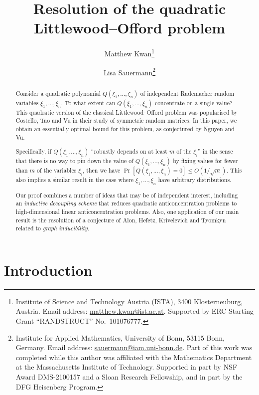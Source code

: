 \documentclass[english]{article}
\theoremstyle{remark}
\numberwithin{equation}{section}
\numberwithin{figure}{section}
\begin{document}
\title{Resolution of the quadratic Littlewood--Offord problem}
\author{Matthew Kwan\thanks{Institute of Science and Technology Austria (ISTA), 3400 Klosterneuburg, Austria. Email address: \url{matthew.kwan@ist.ac.at}. Supported by ERC Starting Grant ``RANDSTRUCT'' No.\ 101076777.}\and Lisa Sauermann\thanks{Institute for Applied Mathematics, University of Bonn, 53115 Bonn, Germany. Email address: \url{sauermann@iam.uni-bonn.de}. Part of this work was completed while this author was affiliated with the Mathematics Department at the Massachusetts Institute of Technology. Supported in part by NSF Award DMS-2100157 and a Sloan Research Fellowship, and in part by the DFG Heisenberg Program.}}

\maketitle

\begin{abstract}\noindent
Consider a quadratic polynomial $Q(\xi_{1},\dots,\xi_{n})$ of independent
Rademacher random variables $\xi_{1},\dots,\xi_{n}$. To what extent
can $Q(\xi_{1},\dots,\xi_{n})$ concentrate on a single value? This quadratic version of the classical Littlewood--Offord problem was popularised by Costello, Tao and Vu in their study of symmetric random matrices.
In this paper, we obtain an essentially optimal bound for this problem, as conjectured by Nguyen and Vu.

Specifically, if $Q(\xi_{1},\dots,\xi_{n})$ ``robustly depends on
at least $m$ of the $\xi_{i}$'' in the sense that there is no way to pin
down the value of $Q(\xi_{1},\dots,\xi_{n})$ by fixing values for
fewer than $m$ of the variables $\xi_{i}$, then we have $\Pr[Q(\xi_{1},\dots,\xi_{n})=0]\le O(1/\sqrt{m})$. This also implies a similar result in the case where
$\xi_{1},\dots,\xi_{n}$ have arbitrary distributions.

Our proof combines a number of ideas that may be of independent interest, including an \emph{inductive decoupling scheme} that reduces quadratic anticoncentration problems to high-dimensional linear anticoncentration problems. Also, one application of our main result is the resolution of a conjecture of Alon, Hefetz, Krivelevich
and Tyomkyn related to \emph{graph inducibility}.
\end{abstract}

\section{Introduction}
\end{document}
